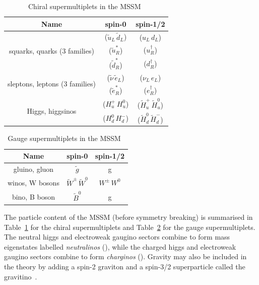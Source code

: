 \begin{table}[!h]
  \centering
  \caption{Chiral supermultiplets in the MSSM~\cite{SUSYP}}
  \label{tab:chiral}
  \begin{tabular}
    {ccc}
    \hline\hline
    Name& spin-0 & spin-1/2 \\
    \hline
    \multirow{3}{*}{squarks, quarks (3 families) }& ($\tilde{u}_L\,\tilde{d}_L$) & ($u_L\,d_L$) \\
    & ($\tilde{u}^{*}_R$) & ($u_R^{\dagger}$) \\
    & ($\tilde{d}^{*}_R$) & ($d_R^{\dagger}$) \\
    \hline
    \multirow{2}{*}{sleptons, leptons (3 families) }& ($\tilde{\nu}\,\tilde{e}_L$) & ($\nu_L\,e_L$) \\
    & ($\tilde{e}^{*}_R$) & ($e_R^{\dagger}$) \\
    \hline
    \multirow{2}{*}{Higgs, higgsinos}& ($H_u^{+}\,H_u^{0}$) &  ($\tilde{H}_u^{+}\,\tilde{H}_u^{0}$) \\
    & ($H_d^{0}\,H_d^{-}$) &  ($\tilde{H}_d^{0}\,\tilde{H}_d^{-}$) \\
  \end{tabular}
\end{table}

\begin{table}[!h]
  \centering
  \caption{Gauge supermultiplets in the MSSM~\cite{SUSYP}}
  \label{tab:vector}
  \begin{tabular}
    {ccc}
    \hline\hline
    Name& spin-0 & spin-1/2 \\
    \hline
    gluino, gluon & $\tilde{g}$ & g \\
    winos, W bosons & $\tilde{W}^{\pm}\,\tilde{W}^0$ & $W^{\pm}\,W^{0}$ \\
    bino, B boson & $\tilde{B}^0$ & g \\
  \end{tabular}
\end{table}

The particle content of the MSSM (before symmetry breaking) 
is summarised in Table~\ref{tab:chiral} for the chiral supermultiplets
and Table~\ref{tab:vector} for the gauge supermultiplets. The neutral higgs and electroweak 
gaugino sectors combine to form mass eigenstates labelled \emph{neutralinos} 
(\chiz), while the charged higgs and electroweak gaugino sectors combine
to form \emph{charginos} (\chip). Gravity may also be included in the theory
by adding a spin-2 graviton and a spin-3/2 superparticle
called the gravitino~\cite{SUSYP}. 

